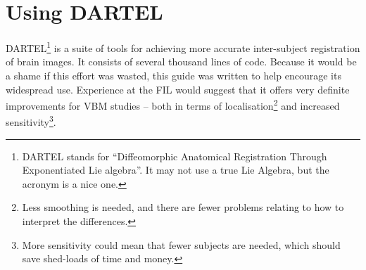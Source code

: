 \chapter{Using DARTEL \label{Chap:dartelguide}}

DARTEL\footnote{DARTEL stands for ``Diffeomorphic Anatomical Registration Through Exponentiated Lie algebra''.
It may not use a true Lie Algebra, but the acronym is a nice one.} is a suite of tools for achieving more accurate inter-subject registration of brain images.
It consists of several thousand lines of code. Because it would be a shame if this effort was wasted, this guide was written to help encourage its widespread use.
Experience at the FIL would suggest that it offers very definite improvements for VBM studies -- both in terms of localisation\footnote{Less smoothing is needed, and there are fewer problems relating to how to interpret the differences.} and increased sensitivity\footnote{More sensitivity could mean that fewer subjects are needed, which should save shed-loads of time and money.}.



